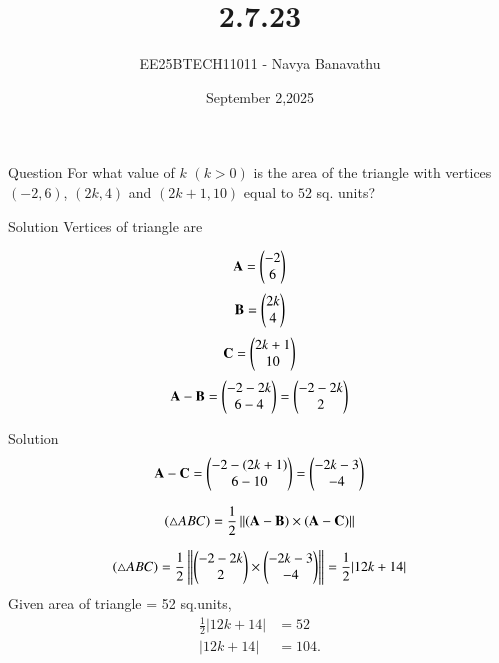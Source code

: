 \documentclass{beamer}
\title{2.7.23}
\date{September 2,2025}
\author{EE25BTECH11011 - Navya Banavathu}
\begin{document}
\frame{\titlepage}

\begin{frame}{Question}
For what value of $k$ $(k>0)$ is the area of the triangle with vertices $(-2,6)$, $(2k,4)$ and $(2k+1,10)$ equal to $52$ sq. units?
\end{frame}

\begin{frame}{Solution}
Vertices of triangle are

\begin{align}
\mathbf{A} = \begin{pmatrix}-2 \\ 6\end{pmatrix}
\end{align}
\begin{align}
\mathbf{B} = \begin{pmatrix}2k \\ 4\end{pmatrix}
\end{align}
\begin{align}
\mathbf{C} = \begin{pmatrix}2k+1 \\ 10\end{pmatrix}
\end{align}
\begin{align}
\mathbf{A}-\mathbf{B} 
= \begin{pmatrix}-2-2k \\ 6-4\end{pmatrix} = \begin{pmatrix}-2-2k \\ 2\end{pmatrix}
\end{align}
\end{frame}

\begin{frame}{Solution}
\begin{align}
\mathbf{A} - \mathbf{C} = \begin{pmatrix}-2-(2k+1) \\ 6-10\end{pmatrix} = \begin{pmatrix}-2k-3 \\-4 \end{pmatrix}
\end{align}

\begin{align}
(\triangle ABC)=\frac{1}{2}\left\lVert(\mathbf{A}-\mathbf{B}) \times (\mathbf{A}-\mathbf{C})\right\rVert
\end{align}

\begin{align}
(\triangle ABC)=\frac{1}{2}\left\lVert\begin{pmatrix}-2-2k \\ 2\end{pmatrix} \times \begin{pmatrix}-2k-3 \\ -4\end{pmatrix}\right\rVert=\frac{1}{2} |12k + 14|
\end{align}
Given area of triangle = 52 sq.units, \\
\begin{align}
\frac{1}{2}|12k+14| &= 52 \\[6pt]
|12k+14| &= 104.
\end{align}
\end{frame}
\end{document}
